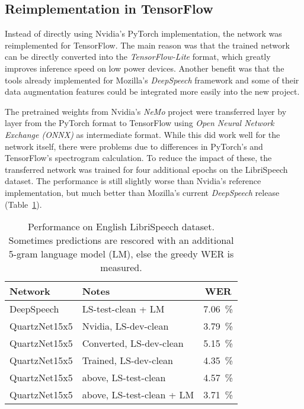 \documentclass[a4paper]{article}
\begin{document}
\subsection{Reimplementation in TensorFlow}

Instead of directly using Nvidia's PyTorch implementation, the network was reimplemented for TensorFlow. The main reason was that the trained network can be directly converted into the \textit{TensorFlow-Lite} format, which greatly improves inference speed on low power devices. Another benefit was that the tools already implemented for Mozilla's \textit{DeepSpeech} framework and some of their data augmentation features could be integrated more easily into the new project.

The pretrained weights from Nvidia's \textit{NeMo} project were transferred layer by layer from the PyTorch format to TensorFlow using \textit{Open Neural Network Exchange (ONNX)} as intermediate format.
While this did work well for the network itself, there were problems due to differences in PyTorch's and TensorFlow's spectrogram calculation. To reduce the impact of these, the transferred network was trained for four additional epochs on the LibriSpeech dataset. The performance is still slightly worse than Nvidia's reference implementation, but much better than Mozilla's current \textit{DeepSpeech} release (Table~\ref{tab:qen}).

\begin{table}[H]
	\caption{Performance on English LibriSpeech dataset. Sometimes predictions are rescored with an additional 5-gram language model (LM), else the greedy WER is measured.}
	\label{tab:qen}
	\centering
	\begin{tabular}{llc}
		\toprule
		\textbf{Network} & \textbf{Notes} & \textbf{WER} \\
		\midrule
		DeepSpeech & LS-test-clean + LM & \SI{7.06}{\percent} \\
		\midrule
		QuartzNet15x5 & Nvidia, LS-dev-clean & \SI{3.79}{\percent} \\
		QuartzNet15x5 & Converted, LS-dev-clean & \SI{5.15}{\percent} \\
		QuartzNet15x5 & Trained, LS-dev-clean & \SI{4.35}{\percent} \\
		QuartzNet15x5 & above, LS-test-clean & \SI{4.57}{\percent} \\
		QuartzNet15x5 & above, LS-test-clean + LM & \SI{3.71}{\percent} \\
		\bottomrule
	\end{tabular}
\end{table}
\end{document}
